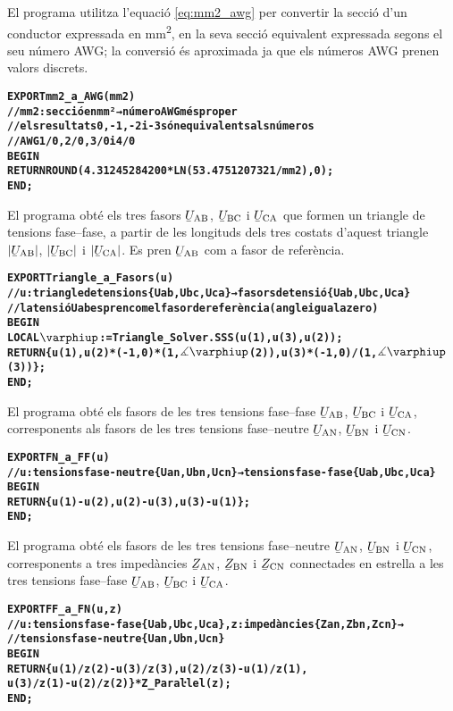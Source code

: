 El programa  utilitza l'equació \eqref{eq:mm2_awg} per convertir la secció d'un conductor expressada en \si{mm^2}, en la seva secció equivalent expressada segons el seu número AWG; la conversió és aproximada ja que els números AWG prenen valors discrets.
\vspace{-1cm}
\begin{alltt}
\bfseries
{}
    EXPORT mm2_a_AWG(mm2)
    // mm2:secció en mm² → número AWG més proper
    // els resultats 0, -1, -2 i -3 són equivalents als números
    // AWG 1/0, 2/0, 3/0 i 4/0
    BEGIN
      RETURN ROUND(4.31245284200*LN(53.4751207321/mm2),0);
    END;
\end{alltt}


El programa  obté els tres fasors $\cmplx{U}\ped{AB}$, $\cmplx{U}\ped{BC}$ i $\cmplx{U}\ped{CA}$ que formen un triangle de tensions fase--fase, a partir de les longituds dels tres costats d'aquest triangle $|\cmplx{U}\ped{AB}|$, $|\cmplx{U}\ped{BC}|$ i $|\cmplx{U}\ped{CA}|$. Es pren $\cmplx{U}\ped{AB}$ com a fasor de referència.
\vspace{-1cm}
\begin{alltt}
\bfseries
{}
    EXPORT Triangle_a_Fasors(u)
    // u:triangle de tensions \{Uab,Ubc,Uca\} → fasors de tensió \{Uab,Ubc,Uca\}
    // la tensió Uab es pren com el fasor de referència (angle igual a zero)
    BEGIN
      LOCAL \(\varphiup\):=Triangle_Solver.SSS(u(1),u(3),u(2));
      RETURN \{u(1),u(2)*(-1,0)*(1,\(\measuredangle\varphiup\)(2)),u(3)*(-1,0)/(1,\(\measuredangle\varphiup\)(3))\};
    END;
\end{alltt}

El programa  obté els fasors de les tres tensions fase--fase $\cmplx{U}\ped{AB}$, $\cmplx{U}\ped{BC}$ i $\cmplx{U}\ped{CA}$, corresponents als fasors de les tres tensions fase--neutre
$\cmplx{U}\ped{AN}$, $\cmplx{U}\ped{BN}$ i $\cmplx{U}\ped{CN}$.
\vspace{-1cm}
\begin{alltt}
\bfseries
{}
    EXPORT FN_a_FF(u)
    // u:tensions fase-neutre \{Uan,Ubn,Ucn\} → tensions fase-fase \{Uab,Ubc,Uca\}
    BEGIN
      RETURN \{u(1)-u(2),u(2)-u(3),u(3)-u(1)\};
    END;
\end{alltt}

El programa  obté els fasors de les tres tensions fase--neutre $\cmplx{U}\ped{AN}$, $\cmplx{U}\ped{BN}$ i $\cmplx{U}\ped{CN}$, corresponents a tres impedàncies $\cmplx{Z}\ped{AN}$, $\cmplx{Z}\ped{BN}$ i $\cmplx{Z}\ped{CN}$ connectades en estrella a  les tres tensions fase--fase
$\cmplx{U}\ped{AB}$, $\cmplx{U}\ped{BC}$ i $\cmplx{U}\ped{CA}$.
\pagebreak
\begin{alltt}
\bfseries
{}
    EXPORT FF_a_FN(u,z)
    // u:tensions fase-fase \{Uab,Ubc,Uca\}, z:impedàncies \{Zan,Zbn,Zcn\} →
    // tensions fase-neutre \{Uan,Ubn,Ucn\}
    BEGIN
      RETURN \{u(1)/z(2)-u(3)/z(3),u(2)/z(3)-u(1)/z(1),
              u(3)/z(1)-u(2)/z(2)\}*Z_Paraŀlel(z);
    END;
\end{alltt}

